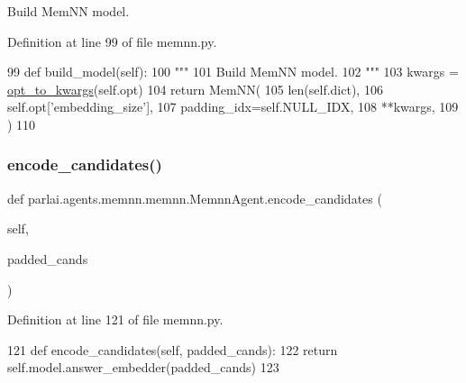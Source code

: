 \begin{DoxyVerb}Build MemNN model.
\end{DoxyVerb}
 

Definition at line 99 of file memnn.\+py.


\begin{DoxyCode}
99     \textcolor{keyword}{def }build\_model(self):
100         \textcolor{stringliteral}{"""}
101 \textcolor{stringliteral}{        Build MemNN model.}
102 \textcolor{stringliteral}{        """}
103         kwargs = \hyperlink{namespaceparlai_1_1agents_1_1legacy__agents_1_1seq2seq_1_1modules__v1_af13e3733abb5828b0c0a75d95833441c}{opt\_to\_kwargs}(self.opt)
104         \textcolor{keywordflow}{return} MemNN(
105             len(self.dict),
106             self.opt[\textcolor{stringliteral}{'embedding\_size'}],
107             padding\_idx=self.NULL\_IDX,
108             **kwargs,
109         )
110 
\end{DoxyCode}
\mbox{\label{classparlai_1_1agents_1_1memnn_1_1memnn_1_1MemnnAgent_ab0c47ca129aeec437446202c941e0a56}} 
\subsubsection{\texorpdfstring{encode\+\_\+candidates()}{encode\_candidates()}}
{\footnotesize\ttfamily def parlai.\+agents.\+memnn.\+memnn.\+Memnn\+Agent.\+encode\+\_\+candidates (\begin{DoxyParamCaption}\item[{}]{self,  }\item[{}]{padded\+\_\+cands }\end{DoxyParamCaption})}



Definition at line 121 of file memnn.\+py.


\begin{DoxyCode}
121     \textcolor{keyword}{def }encode\_candidates(self, padded\_cands):
122         \textcolor{keywordflow}{return} self.model.answer\_embedder(padded\_cands)
123 
\end{DoxyCode}
\mbox{\label{classparlai_1_1agents_1_1memnn_1_1memnn_1_1MemnnAgent_ae6e06364ccf919d70064d5966e5c1cf3}} 
